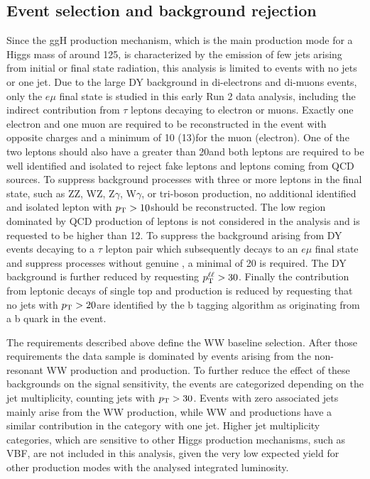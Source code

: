 \subsection{Event selection and background rejection}\label{chap5:eventSel}

Since the ggH production mechanism, which is the main production mode for a Higgs mass of around 125\GeV, is characterized by the emission of few jets arising from initial or final state radiation, this analysis is limited to events with no jets or one jet. Due to the large DY background in di-electrons and di-muons events, only the $e\mu$ final state is studied in this early Run 2 data analysis, including the indirect contribution from $\tau$ leptons decaying to electron or muons.
Exactly one electron and one muon are required to be reconstructed in the event with opposite charges and a minimum \pt of 10 (13)\GeV for  the muon (electron). One of the two leptons should also have a \pt greater than 20\GeV and both leptons are required to be well identified and isolated to reject fake leptons and leptons coming from QCD sources. To suppress background processes with three or more leptons in the final state, such as ZZ, WZ, Z$\gamma$, W$\gamma$, or tri-boson production, no additional identified and isolated lepton with $p_\mathrm{T}>10$\GeV should be reconstructed. The low \mll region dominated by QCD production of leptons
is not considered in the analysis and \mll is requested to be higher than 12\GeV. To suppress the background arising from DY events decaying to a $\tau$ lepton pair which subsequently
decays to an $e\mu$ final state and suppress processes without genuine \MET, a minimal \MET of 20\GeV
is required. The DY background is further reduced by requesting $p_\mathrm{T}^{\ell\ell} > 30$\GeV.
 Finally the contribution from leptonic decays of single top and \ttbar production is reduced by requesting
that no jets with $p_\mathrm{T}>20$\GeV are identified by the b tagging algorithm as originating from a b quark in the event.

The requirements described above define the WW baseline selection. After those requirements the data sample is dominated by events arising from the non-resonant WW production and \ttbar production. To further reduce the effect of these backgrounds on the signal sensitivity, the events are categorized depending on the jet multiplicity, counting jets with $p_\mathrm{T} > 30$\GeV. Events with zero associated jets mainly arise from the WW production, while WW and \ttbar productions have a similar contribution in the category with one jet. Higher jet multiplicity categories, which are sensitive to other Higgs production mechanisms, such as VBF, are not included in this analysis, given the very low expected yield for other production modes with the analysed integrated luminosity.


